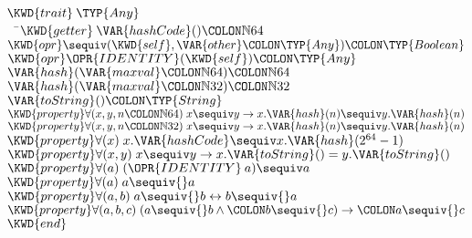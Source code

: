 \begin{Fortress}
\(\KWD{trait}\mskip 4mu plus 4mu\TYP{Any}\)\\
{\tt~~}\pushtabs\=\+\(  \KWD{getter}\mskip 4mu plus 4mu\VAR{hashCode}()\COLON \mathbb{N}64\)\\
\(  \KWD{opr} \mathord{\sequiv}(\KWD{self}, \VAR{other}\COLON \TYP{Any})\COLON \TYP{Boolean}\)\\
\(  \KWD{opr} \mathord{\OPR{IDENTITY}}(\KWD{self})\COLON \TYP{Any}\)\\
\(  \VAR{hash}(\VAR{maxval}\COLON \mathbb{N}64)\COLON \mathbb{N}64\)\\
\(  \VAR{hash}(\VAR{maxval}\COLON \mathbb{N}32)\COLON \mathbb{N}32\)\\
\(  \VAR{toString}()\COLON \TYP{String}\)\\
\(  \KWD{property} \forall (x, y, n\COLON \mathbb{N}64)\; x \sequiv y \rightarrow x.\VAR{hash}(n) \sequiv y.\VAR{hash}(n)\)\\
\(  \KWD{property} \forall (x, y, n\COLON \mathbb{N}32)\; x \sequiv y \rightarrow x.\VAR{hash}(n) \sequiv y.\VAR{hash}(n)\)\\
\(  \KWD{property} \forall (x)\; x.\VAR{hashCode} \sequiv x.\VAR{hash}(2^{64}-1)\)\\
\(  \KWD{property} \forall (x, y)\; x \sequiv y \rightarrow x.\VAR{toString}() = y.\VAR{toString}()\)\\
\(  \KWD{property} \forall (a)\; (\OPR{IDENTITY}\mskip 4mu plus 4mu{a}) \sequiv a\)\\
\(  \KWD{property} \forall (a)\; a\sequiv{}a\)\\
\(  \KWD{property} \forall (a,b)\; a\sequiv{}b \leftrightarrow b\sequiv{}a\)\\
\(  \KWD{property} \forall (a,b,c)\; (a\sequiv{}b \wedge\COLON b\sequiv{}c) \rightarrow\COLON a\sequiv{}c\)\-\\\poptabs
\(\KWD{end}\)
\end{Fortress}


